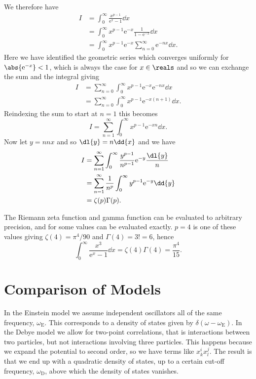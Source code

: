 \documentclass[fleqn]{NotesClass}
\newcommand*{\e}{\mathrm{e}}
\begin{document}
    We therefore have
    \begin{align}
        I &= \int_{0}^{\infty} \frac{x^{p - 1}}{\e^{x} - 1} \dd{x}\\
        &= \int_{0}^{\infty} x^{p - 1} \e^{-x} \frac{1}{1 - \e^{-x}} \dd{x}\\
        &= \int_{0}^{\infty} x^{p - 1} \e^{-x} \sum_{n = 0}^{\infty} \e^{-nx} \dd{x}.
    \end{align}
    Here we have identified the geometric series which converges uniformly for \(\abs{\e^{-x}} < 1\), which is always the case for \(x \in \reals\) and so we can exchange the sum and the integral giving
    \begin{align}
        I &= \sum_{n = 0}^{\infty} \int_{0}^{\infty} x^{p - 1} \e^{-x} \e^{-nx} \dd{x}\\
        &= \sum_{n = 0}^{\infty} \int_{0}^{\infty} x^{p - 1} \e^{-x(n + 1)} \dd{x}.
    \end{align}
    Reindexing the sum to start at \(n = 1\) this becomes
    \begin{equation}
        I = \sum_{n = 1}^{\infty} \int_{0}^{\infty} x^{p - 1} \e^{-xn} \dd{x}.
    \end{equation}
    Now let \(y = nnx\) and so \(\dl{y} = n\dd{x}\) and we have
    \begin{align}
        I &= \sum_{n = 1}^{\infty} \int_{0}^{\infty} \frac{y^{p - 1}}{n^{p - 1}} \e^{-y} \frac{\dl{y}}{n}\\
        &= \sum_{n = 1}^{\infty} \frac{1}{n^p} \int_{0}^{\infty} y^{p - 1} \e^{-y} \dd{y}\\
        &= \zeta(p)\Gamma(p).
    \end{align}
    
    The Riemann zeta function and gamma function can be evaluated to arbitrary precision, and for some values can be evaluated exactly.
    \(p = 4\) is one of these values giving \(\zeta(4) = \pi^4/90\) and \(\Gamma(4) = 3! = 6\), hence
    \begin{equation}
        \int_{0}^{\infty} \frac{x^3}{\e^{x} - 1} \dd{x} = \zeta(4)\Gamma(4) = \frac{\pi^4}{15}.
    \end{equation}

    \section{Comparison of Models}
    In the Einstein model we assume independent oscillators all of the same frequency, \(\omega_{\mathrm{E}}\).
    This corresponds to a density of states given by \(\delta(\omega - \omega_{\mathrm{E}})\).
    In the Debye model we allow for two-point correlations, that is interactions between two particles, but not interactions involving three particles.
    This happens because we expand the potential to second order, so we have terms like \(x_k^i x_l^j\).
    The result is that we end up with a quadratic density of states, up to a certain cut-off frequency, \(\omega_{\mathrm{D}}\), above which the density of states vanishes.
    
\end{document}
